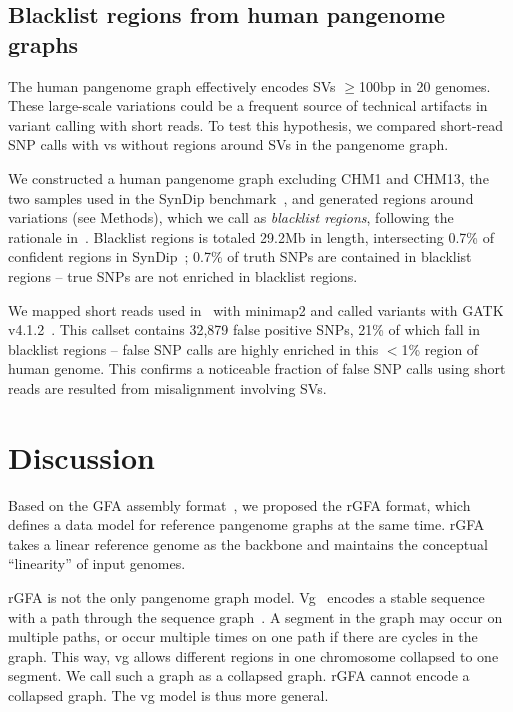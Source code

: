 \documentclass[twocolumn]{bmcart}
\begin{document}
\subsection*{Blacklist regions from human pangenome graphs}

The human pangenome graph effectively encodes SVs $\ge$100bp
in 20 genomes. These large-scale variations could be a frequent source of
technical artifacts in variant calling with short reads. To test this
hypothesis, we compared short-read SNP calls with vs without regions around SVs
in the pangenome graph.

We constructed a human pangenome graph excluding CHM1 and CHM13, the two
samples used in the SynDip benchmark~\cite{Li:2018aa}, and generated regions
around variations (see Methods), which we call as \emph{blacklist regions},
following the rationale in~\cite{Amemiya:2019aa}.  Blacklist regions is totaled
29.2Mb in length, intersecting 0.7\% of confident regions in
SynDip~\cite{Li:2018aa}; 0.7\% of truth SNPs are contained in blacklist regions
-- true SNPs are not enriched in blacklist regions.

We mapped short reads used in~\cite{Li:2018aa} with minimap2 and called
variants with GATK v4.1.2~\cite{Depristo:2011vn}. This callset
contains 32,879 false positive SNPs, 21\% of which fall in blacklist regions --
false SNP calls are highly enriched in this $<$1\% region of human genome. This
confirms a noticeable fraction of false SNP calls using short reads are
resulted from misalignment involving SVs.

\section*{Discussion}

Based on the GFA assembly format~\cite{Li:2016aa}, we proposed the rGFA format,
which defines a data model for reference pangenome graphs at the same time.
rGFA takes a linear reference genome as the backbone and maintains the
conceptual ``linearity'' of input genomes.

rGFA is not the only pangenome graph model. Vg~\cite{Garrison:2018aa}
encodes a stable sequence with a path through the sequence graph~\cite{10.12688/f1000research.19630.1}. A segment
in the graph may occur on multiple paths, or occur multiple times on one path
if there are cycles in the graph. This way, vg allows different regions in one
chromosome collapsed to one segment. We call such a graph as a collapsed graph. rGFA
cannot encode a collapsed graph. The vg model is thus more general.
\end{document}
